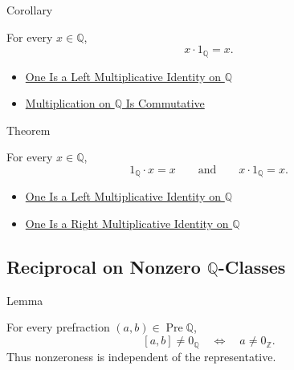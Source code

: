 \begin{corollarybox}{Corollary}
\begin{corollary}
\label{cor:one-right-multiplicative-identity-on-q}
For every $x\in\mathbb{Q}$,
\[
x\cdot 1_{\mathbb{Q}}=x.
\]
\end{corollary}
\end{corollarybox}

\begin{dependencies}
\begin{itemize}
  \item \hyperref[thm:one-left-multiplicative-identity-on-q]{One Is a Left Multiplicative Identity on $\mathbb{Q}$}
  \item \hyperref[thm:multiplication-on-q-commutative]{Multiplication on $\mathbb{Q}$ Is Commutative}
\end{itemize}
\end{dependencies}

\begin{theorembox}{Theorem}
\begin{theorem}
\label{thm:one-multiplicative-identity-on-q}
For every $x\in\mathbb{Q}$,
\[
1_{\mathbb{Q}}\cdot x=x
\qquad\text{and}\qquad
x\cdot 1_{\mathbb{Q}}=x.
\]
\end{theorem}
\end{theorembox}

\begin{dependencies}
\begin{itemize}
  \item \hyperref[thm:one-left-multiplicative-identity-on-q]{One Is a Left Multiplicative Identity on $\mathbb{Q}$}
  \item \hyperref[cor:one-right-multiplicative-identity-on-q]{One Is a Right Multiplicative Identity on $\mathbb{Q}$}
\end{itemize}
\end{dependencies}

\subsection*{\texorpdfstring{Reciprocal on Nonzero $\mathbb{Q}$-Classes}{Reciprocal on Nonzero Q-Classes}}

\begin{lemmabox}{Lemma}
\begin{lemma}
\label{lem:nonzero-predicate-well-defined-q}
For every prefraction $(a,b)\in\operatorname{Pre}\mathbb{Q}$,
\[
[a,b]\ne 0_{\mathbb{Q}}
\quad\Longleftrightarrow\quad
a\ne 0_{\mathbb{Z}}.
\]
Thus nonzeroness is independent of the representative.
\end{lemma}
\end{lemmabox}

